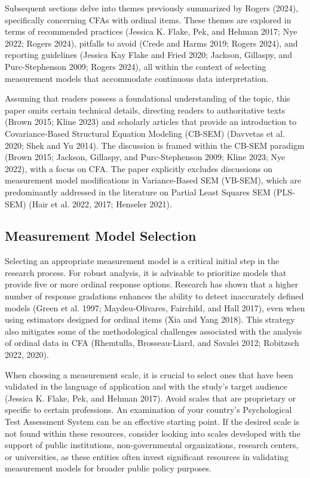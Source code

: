 \documentclass[
  a4paper,
]{article}
\begin{document}
Subsequent sections delve into themes previously summarized by Rogers
(2024), specifically concerning CFAs with ordinal items. These themes
are explored in terms of recommended practices (Jessica K. Flake, Pek,
and Hehman 2017; Nye 2022; Rogers 2024), pitfalls to avoid (Crede and
Harms 2019; Rogers 2024), and reporting guidelines (Jessica Kay Flake
and Fried 2020; Jackson, Gillaspy, and Purc-Stephenson 2009; Rogers
2024), all within the context of selecting measurement models that
accommodate continuous data interpretation.

Assuming that readers possess a foundational understanding of the topic,
this paper omits certain technical details, directing readers to
authoritative texts (Brown 2015; Kline 2023) and scholarly articles that
provide an introduction to Covariance-Based Structural Equation Modeling
(CB-SEM) (Davvetas et al. 2020; Shek and Yu 2014). The discussion is
framed within the CB-SEM paradigm (Brown 2015; Jackson, Gillaspy, and
Purc-Stephenson 2009; Kline 2023; Nye 2022), with a focus on CFA. The
paper explicitly excludes discussions on measurement model modifications
in Variance-Based SEM (VB-SEM), which are predominantly addressed in the
literature on Partial Least Squares SEM (PLS-SEM) (Hair et al. 2022,
2017; Henseler 2021).

\subsection{Measurement Model
Selection}\label{measurement-model-selection}

Selecting an appropriate measurement model is a critical initial step in
the research process. For robust analysis, it is advisable to prioritize
models that provide five or more ordinal response options. Research has
shown that a higher number of response gradations enhances the ability
to detect inaccurately defined models (Green et al. 1997;
Maydeu-Olivares, Fairchild, and Hall 2017), even when using estimators
designed for ordinal items (Xia and Yang 2018). This strategy also
mitigates some of the methodological challenges associated with the
analysis of ordinal data in CFA (Rhemtulla, Brosseau-Liard, and Savalei
2012; Robitzsch 2022, 2020).

When choosing a measurement scale, it is crucial to select ones that
have been validated in the language of application and with the study's
target audience (Jessica K. Flake, Pek, and Hehman 2017). Avoid scales
that are proprietary or specific to certain professions. An examination
of your country's Psychological Test Assessment System can be an
effective starting point. If the desired scale is not found within these
resources, consider looking into scales developed with the support of
public institutions, non-governmental organizations, research centers,
or universities, as these entities often invest significant resources in
validating measurement models for broader public policy purposes.
\end{document}
